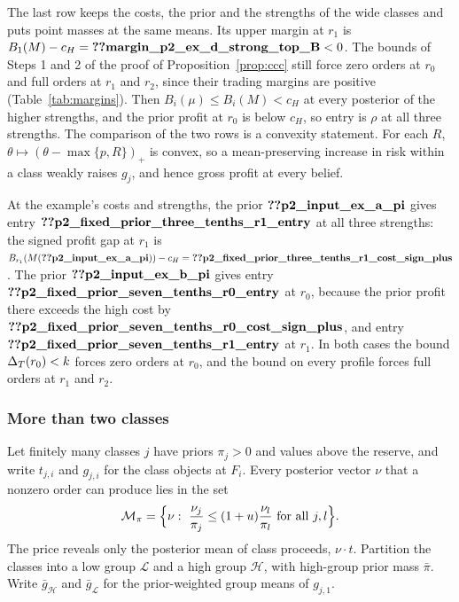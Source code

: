 The last row keeps the costs, the prior and the strengths of the wide classes and puts point masses at the same
means. Its upper margin at \(r_1\) is \(B_1(M)-c_H=\reg{margin_p2_ex_d_strong_top_B}<0\). The bounds of Steps 1 and 2
of the proof of Proposition~\ref{prop:ccc} still force zero orders at \(r_0\) and full orders at \(r_1\) and \(r_2\),
since their trading margins are positive (Table~\ref{tab:margins}). Then \(B_i(\mu)\le B_i(M)<c_H\) at every posterior
of the higher strengths, and the prior profit at \(r_0\) is below \(c_H\), so entry is \(\rho\) at all three strengths.
The comparison of the two rows is a convexity statement. For each \(R\), \(\theta\mapsto(\theta-\max\{p,R\})_+\) is convex, so a
mean-preserving increase in risk within a class weakly raises \(g_j\), and hence gross profit at every belief.

At the example's costs and strengths, the prior \(\reg{p2_input_ex_a_pi}\) gives entry
\(\reg{p2_fixed_prior_three_tenths_r1_entry}\) at all three strengths: the signed profit gap at \(r_1\) is
\(B_{r_1}(M(\reg{p2_input_ex_a_pi}))-c_H=\reg{p2_fixed_prior_three_tenths_r1_cost_sign_plus}\).
The prior \(\reg{p2_input_ex_b_pi}\) gives entry
\(\reg{p2_fixed_prior_seven_tenths_r0_entry}\) at \(r_0\), because the prior profit there exceeds the high cost by
\(\reg{p2_fixed_prior_seven_tenths_r0_cost_sign_plus}\), and entry \(\reg{p2_fixed_prior_seven_tenths_r1_entry}\) at
\(r_1\). In both cases the bound \(\Delta_T(r_0)<k\) forces zero orders at \(r_0\), and the bound on every profile forces
full orders at \(r_1\) and \(r_2\).

\subsubsection*{More than two classes}

Let finitely many classes \(j\) have priors \(\pi_j>0\) and values above the reserve, and write \(t_{j,i}\) and
\(g_{j,i}\) for the class objects at \(F_i\). Every posterior vector \(\nu\) that a nonzero order can produce lies in the set
\[
\mathcal M_\pi=\Bigl\{\nu:\ \frac{\nu_j}{\pi_j}\le(1+u)\frac{\nu_l}{\pi_l}\ \text{for all } j,l\Bigr\}.
\]
The price reveals only the posterior mean of class proceeds, \(\nu\cdot t\). Partition the classes into a low group
\(\mathcal L\) and a high group \(\mathcal H\), with high-group prior mass \(\bar\pi\). Write \(\bar g_{\mathcal
H}\) and \(\bar g_{\mathcal L}\) for the prior-weighted group means of \(g_{j,1}\).

